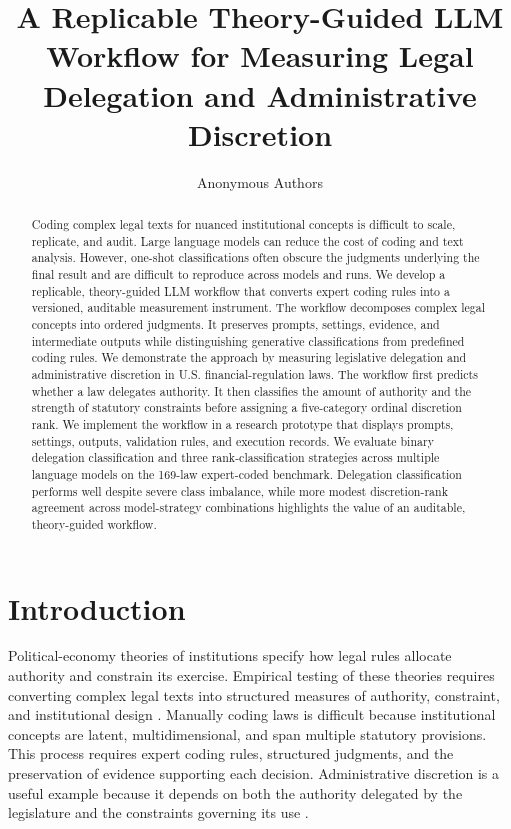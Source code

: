 \documentclass[runningheads]{llncs}
\title{A Replicable Theory-Guided LLM Workflow for Measuring Legal Delegation and Administrative Discretion}
\author{Anonymous Authors}
\institute{}
\begin{document}
\maketitle
\vspace{-0.7 cm}

\begin{abstract}

Coding complex legal texts for nuanced institutional concepts is difficult to scale, replicate, and audit. Large language models can reduce the cost of coding and text analysis. However, one-shot classifications often obscure the judgments underlying the final result and are difficult to reproduce across models and runs. We develop a replicable, theory-guided LLM workflow that converts expert coding rules into a versioned, auditable measurement instrument. The workflow decomposes complex legal concepts into ordered judgments. It preserves prompts, settings, evidence, and intermediate outputs while distinguishing generative classifications from predefined coding rules. We demonstrate the approach by measuring legislative delegation and administrative discretion in U.S. financial-regulation laws. The workflow first predicts whether a law delegates authority. It then classifies the amount of authority and the strength of statutory constraints before assigning a five-category ordinal discretion rank. We implement the workflow in a research prototype that displays prompts, settings, outputs, validation rules, and execution records. We evaluate binary delegation classification and three rank-classification strategies across multiple language models on the 169-law expert-coded benchmark. Delegation classification performs well despite severe class imbalance, while more modest discretion-rank agreement across model-strategy combinations highlights the value of an auditable, theory-guided workflow.


\end{abstract}



\vspace{-0.2 cm}
\section{Introduction}
\vspace{-0.2 cm}

Political-economy theories of institutions specify how legal rules allocate authority and constrain its exercise. Empirical testing of these theories requires converting complex legal texts into structured measures of authority, constraint, and institutional design \cite{grimmer2013text}. Manually coding laws is difficult because institutional concepts are latent, multidimensional, and span multiple statutory provisions. This process requires expert coding rules, structured judgments, and the preservation of evidence supporting each decision. Administrative discretion is a useful example because it depends on both the authority delegated by the legislature and the constraints governing its use \cite{epstein1999delegating}.
\end{document}
